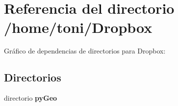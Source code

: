 \section{Referencia del directorio /home/toni/\-Dropbox}
\label{dir_7eb09e58583f359e753ec9733cdd3f32}
Gráfico de dependencias de directorios para Dropbox\-:
\subsection*{Directorios}
\begin{DoxyCompactItemize}
\item 
directorio {\bf py\-Geo}
\end{DoxyCompactItemize}
